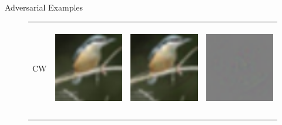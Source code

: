 \documentclass[final]{beamer}
\newlength{\onecolwid}
\newlength{\twocolwid}
\begin{document}
\begin{frame}[t]
\begin{columns}[t]
\begin{column}{\twocolwid}
\begin{columns}[t,totalwidth=\twocolwid]
\begin{column}{\onecolwid}
\begin{block}{Adversarial Examples}
	\begin{figure}[h]
		\centering
		\begin{tabular}{rlll} 
			CW & \includegraphics[height=4cm, align=c]{../figures/carlini_wagner_orig.pdf} & \includegraphics[height=4cm, align=c]{../figures/carlini_wagner_adversarial.pdf} & \includegraphics[height=4cm, align=c]{../figures/carlini_wagner_diff.pdf}\\
			\\

\end{tabular}
\end{figure}
\end{block}
\end{column}
\end{columns}
\end{column}
\end{columns}
\end{frame}
\end{document}
